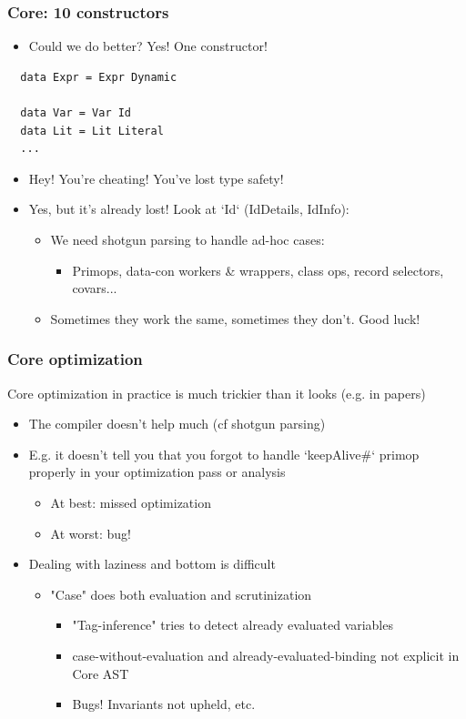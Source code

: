 \documentclass[aspectratio=169]{beamer}
\begin{document}
\begin{frame}[fragile]
  \frametitle{Core: 10 constructors}
  \begin{itemize}
    \item Could we do better?
    \pause
     Yes! One constructor!
  \end{itemize}
  \begin{lstlisting}
  data Expr = Expr Dynamic

  data Var = Var Id
  data Lit = Lit Literal
  ...
  \end{lstlisting}
  \pause
  \begin{itemize}
    \item Hey! You're cheating! You've lost type safety!
    \pause
    \item Yes, but it's already lost! Look at `Id` (IdDetails, IdInfo):
      \begin{itemize}
        \item We need shotgun parsing to handle ad-hoc cases:
        \begin{itemize}
          \item Primops, data-con workers \& wrappers, class ops, record
            selectors, covars...
        \end{itemize}
        \item Sometimes they work the same, sometimes they don't. Good luck!
      \end{itemize}
  \end{itemize}
\end{frame}

\begin{frame}
  \frametitle{Core optimization}
  Core optimization in practice is much trickier than it looks (e.g. in papers)
  \begin{itemize}
    \item The compiler doesn't help much (cf shotgun parsing)
    \item E.g. it doesn't tell you that you forgot to handle `keepAlive\#`
      primop properly in your optimization pass or analysis
      \begin{itemize}
        \item At best: missed optimization
        \item At worst: bug!
      \end{itemize}
    \pause
    \item Dealing with laziness and bottom is difficult
      \begin{itemize}
        \item "Case" does both evaluation and scrutinization
          \begin{itemize}
            \item "Tag-inference" tries to detect already evaluated variables
            \item case-without-evaluation and already-evaluated-binding not explicit in Core AST
            \item Bugs! Invariants not upheld, etc.
          \end{itemize}
      \end{itemize}
  \end{itemize}
\end{frame}
\end{document}
